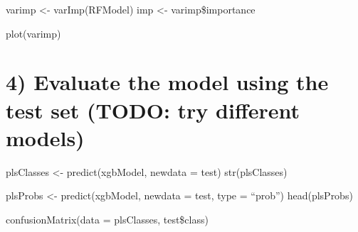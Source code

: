 \documentclass[]{article}
\begin{document}
varimp \textless- varImp(RFModel) imp \textless- varimp\$importance

plot(varimp)

\hypertarget{evaluate-the-model-using-the-test-set-todo-try-different-models}{%
\section{4) Evaluate the model using the test set (TODO: try different
models)}\label{evaluate-the-model-using-the-test-set-todo-try-different-models}}

plsClasses \textless- predict(xgbModel, newdata = test) str(plsClasses)

plsProbs \textless- predict(xgbModel, newdata = test, type = ``prob'')
head(plsProbs)

confusionMatrix(data = plsClasses, test\$class)
\end{document}
